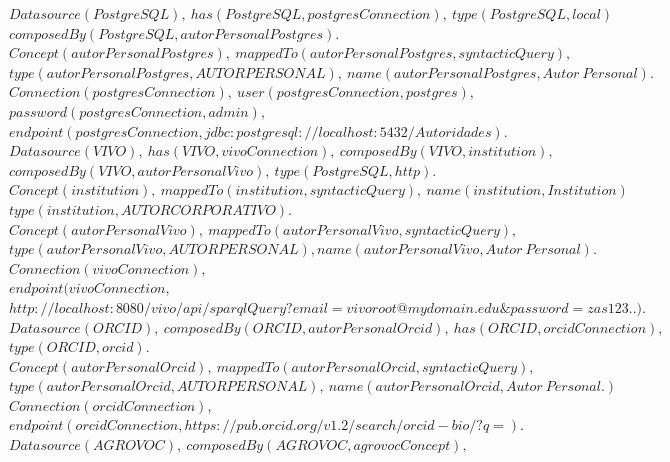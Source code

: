 \begin{minipage}{\textwidth}
$Datasource(PostgreSQL), \ has(PostgreSQL, postgresConnection), \ type(PostgreSQL,local)$ \\
$composedBy(PostgreSQL, autorPersonalPostgres).$ \\
$Concept(autorPersonalPostgres), \ mappedTo(autorPersonalPostgres, syntacticQuery),$ \\
$type(autorPersonalPostgres,AUTORPERSONAL), \ name(autorPersonalPostgres, Autor \ Personal).$\\
$Connection(postgresConnection), \ user(postgresConnection,postgres),$ \\
$password(postgresConnection,admin),$ \\
$endpoint(postgresConnection, jdbc{:}postgresql{:}//localhost{:}5432/Autoridades).$ \\
$Datasource(VIVO), \ has(VIVO, vivoConnection), \ composedBy(VIVO,institution),$ \\
$composedBy(VIVO,autorPersonalVivo), \ type(PostgreSQL,http).$ \\
$Concept(institution), \ mappedTo(institution,syntacticQuery), \ name(institution, Institution)$ \\
$type(institution,AUTORCORPORATIVO).$\\
$Concept(autorPersonalVivo), \ mappedTo(autorPersonalVivo, syntacticQuery),$ \\
$type(autorPersonalVivo, AUTORPERSONAL), name(autorPersonalVivo, Autor \ Personal).$ \\
$Connection(vivoConnection),$\\
$endpoint(vivoConnection, $\\
$http{:}//localhost{:}8080/vivo/api/sparqlQuery?email{=}vivoroot@mydomain.edu\&password{=}zas123..).$\\
$Datasource(ORCID), \ composedBy(ORCID,autorPersonalOrcid), \ has(ORCID,orcidConnection),$ \\
$type(ORCID, orcid).$ \\
$Concept(autorPersonalOrcid), \ mappedTo(autorPersonalOrcid, syntacticQuery),$\\
$type(autorPersonalOrcid,AUTORPERSONAL), \ name(autorPersonalOrcid, Autor \ Personal.)$ \\
$Connection(orcidConnection),$\\
$endpoint(orcidConnection, https{:}//pub{.}orcid{.}org/v1{.}2/search/orcid{-}bio/?q{=}).$\\
$Datasource(AGROVOC), \ composedBy(AGROVOC, agrovocConcept),$\\

\end{minipage}
